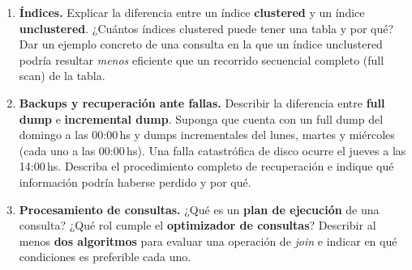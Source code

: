 \documentclass[11pt,a4paper]{article}
\begin{document}
\begin{enumerate}

  \item \textbf{Índices.} Explicar la diferencia entre un índice \textbf{clustered} y un índice \textbf{unclustered}. ¿Cuántos índices clustered puede tener una tabla y por qué? Dar un ejemplo concreto de una consulta en la que un índice unclustered podría resultar \emph{menos} eficiente que un recorrido secuencial completo (full scan) de la tabla.

  \vspace{6cm}

  \item \textbf{Backups y recuperación ante fallas.} Describir la diferencia entre \textbf{full dump} e \textbf{incremental dump}. Suponga que cuenta con un full dump del domingo a las 00:00\,hs y dumps incrementales del lunes, martes y miércoles (cada uno a las 00:00\,hs). Una falla catastrófica de disco ocurre el jueves a las 14:00\,hs. Describa el procedimiento completo de recuperación e indique qué información podría haberse perdido y por qué.

  \vspace{6cm}

  \item \textbf{Procesamiento de consultas.} ¿Qué es un \textbf{plan de ejecución} de una consulta? ¿Qué rol cumple el \textbf{optimizador de consultas}? Describir al menos \textbf{dos algoritmos} para evaluar una operación de \emph{join} e indicar en qué condiciones es preferible cada uno.

  \vspace{6cm}

\end{enumerate}
\end{document}
